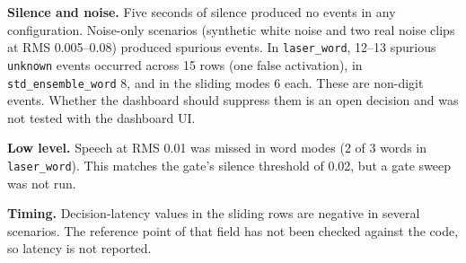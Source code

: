 \documentclass{article}
\begin{document}
\begin{table}[h]
\centering
\footnotesize
{}
\caption{Replay event counts on validation clips, 48 spoken words per configuration. Digit columns are as saved by the harness. In sliding modes they do not sum to 42, because duplicate and unmatched events are counted separately.}
\label{tab:replay}
\end{table}

\textbf{Silence and noise.} Five seconds of silence produced no events in any configuration. Noise-only scenarios (synthetic white noise and two real noise clips at RMS 0.005--0.08) produced spurious events. In \texttt{laser\_word}, 12--13 spurious \texttt{unknown} events occurred across 15 rows (one false activation), in \texttt{std\_ensemble\_word} 8, and in the sliding modes 6 each. These are non-digit events. Whether the dashboard should suppress them is an open decision and was not tested with the dashboard UI.

\textbf{Low level.} Speech at RMS 0.01 was missed in word modes (2 of 3 words in \texttt{laser\_word}). This matches the gate's silence threshold of 0.02, but a gate sweep was not run.

\textbf{Timing.} Decision-latency values in the sliding rows are negative in several scenarios. The reference point of that field has not been checked against the code, so latency is not reported.
\end{document}
